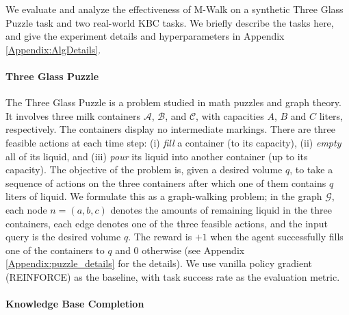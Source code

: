 \documentclass{article}
\newcommand{\mc}{\mathcal}
\begin{document}
	We evaluate and analyze the effectiveness of M-Walk on a synthetic Three Glass Puzzle task and two real-world KBC tasks. We briefly describe the tasks here, and give the experiment details and hyperparameters in Appendix \ref{Appendix:AlgDetails}. 
	
\paragraph{Three Glass Puzzle} The Three Glass Puzzle \cite{ore1990graphs} is a problem studied in math puzzles and graph theory. It involves three milk containers $\mathcal{A}$, $\mathcal{B}$, and $\mathcal{C}$, with capacities $A$, $B$ and $C$ liters, respectively. The containers display no intermediate markings. There are three feasible actions at each time step: (i) \emph{fill} a container (to its capacity),  (ii) \emph{empty} all of its liquid, and (iii) \emph{pour} its liquid into another container (up to its capacity). The objective of the problem is, given a desired volume $q$, to take a sequence of actions on the three containers after which one of them contains $q$ liters of liquid. We formulate this as a graph-walking problem; in the graph $\mc{G}$, each node $n=(a,b,c)$ denotes the amounts of remaining liquid in the three containers, each edge denotes one of the three feasible actions, and the input query is the desired volume $q$. The reward is $+1$ when the agent successfully fills one of the containers to $q$ and $0$ otherwise (see Appendix \ref{Appendix:puzzle_details} for the details).
	We use vanilla policy gradient (REINFORCE) \cite{williams1992simple} as the baseline, with task success rate as the evaluation metric.
	
\paragraph{Knowledge Base Completion}
    
\end{document}
